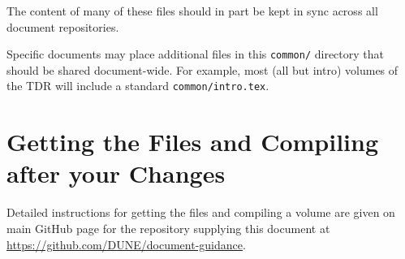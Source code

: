 The content of many of these files should in part be kept in sync
across all document repositories.

Specific documents may place additional files in this \texttt{common/}
directory that should be shared document-wide.
For example, most (all but intro) volumes of the TDR will include a standard \texttt{common/intro.tex}.

\section{Getting the Files and Compiling after your Changes}
\label{sec:tech-compile}

Detailed instructions for getting the files and compiling a volume are
given on main GitHub page for the repository supplying this document at
\url{https://github.com/DUNE/document-guidance}.
  
